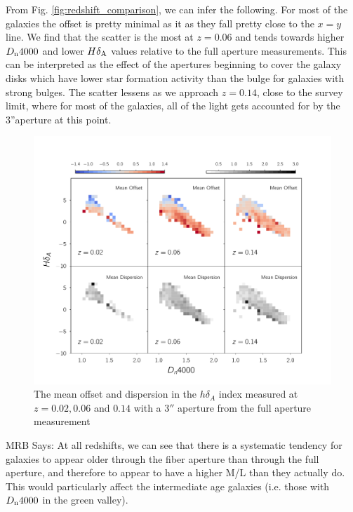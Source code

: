 From Fig. \ref{fig:redshift_comparison}, we can infer the following. For most of the galaxies the offset is pretty minimal as it as they fall pretty close to the $x=y$ line. We find that the scatter is the most at $z = 0.06$ and tends towards higher $D_{\rm n}4000$ and lower $H\delta_{\rm A}$ values relative to the full aperture measurements. This can be interpreted as the effect of the apertures beginning to cover the galaxy disks which have lower star formation activity than the bulge for galaxies with strong bulges. The scatter lessens as we approach $z = 0.14$, close to the survey limit, where for most of the galaxies, all of the light gets accounted for by the 3''aperture at this point.\\

\begin{figure}
\includegraphics[width=\textwidth]{figures/hdelta_full_aperture_comparisons.pdf}
\caption[The mean offset and dispersion in the $h\delta_{A}$ index measured at $z = 0.02,0.06$ and $0.14$ with a $3''$ aperture from the full aperture measurement ]{ The mean offset and dispersion in the $h\delta_{A}$ index measured at $z = 0.02,0.06$ and $0.14$ with a $3''$ aperture from the full aperture measurement 
\label{fig:offset_hdelta}}
\end{figure}

MRB Says: At all redshifts, we can see that there is a systematic tendency for galaxies to appear older through the fiber aperture than through the full aperture, and therefore to appear to have a higher M/L than they actually do. This would particularly affect the intermediate age galaxies (i.e. those with $D_{\rm n}4000$ in the green valley).\\



